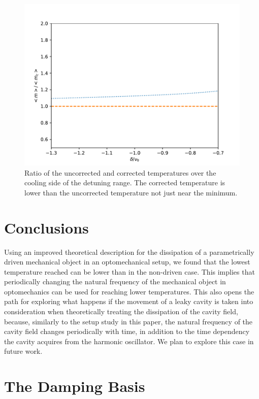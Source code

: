 \documentclass[reprint, amsmath,amssymb, aps,pra]{revtex4-1}
\begin{document}
\begin{figure}
\includegraphics[scale=.5]{TempPropGorden1.pdf}
\caption{Ratio of the uncorrected and corrected temperatures over the cooling side of the detuning range. The corrected temperature is lower than the uncorrected temperature not just near the minimum.}
\label{fig:TempRatio}
\end{figure}





\section{Conclusions}\label{ConCl}

Using an improved theoretical description for the dissipation of a
parametrically driven mechanical object in an optomechanical setup,
we found that the lowest temperature reached can be lower than in the
non-driven case. This implies that periodically changing the natural
frequency of the mechanical object in optomechanics can be used for
reaching lower temperatures. This also opens the path for exploring
what happens if the movement of a leaky cavity is taken into
consideration when theoretically treating the dissipation of the
cavity field, because, similarly to the setup study in this paper, the
natural frequency of the cavity field changes periodically with time, in addition to the time dependency the cavity acquires from the harmonic oscillator.
We plan to explore this case in future work.
 
\appendix
\section{The Damping Basis}\label{App1}
\end{document}
